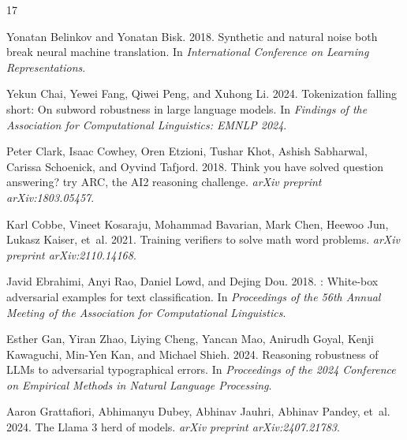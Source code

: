 \documentclass[11pt]{article} %
\providecommand{\DIFdelend}{} %
\DeclareRobustCommand{\DIFdelend}{\DIFOaddend \let\includegraphics\DIFOincludegraphics} %
\begin{document}
\DIFdelend \begin{thebibliography}{17}
\providecommand{\natexlab}[1]{#1}

Yonatan Belinkov and Yonatan Bisk. 2018.
\newblock Synthetic and natural noise both break neural machine translation.
\newblock In \emph{International Conference on Learning Representations}.

Yekun Chai, Yewei Fang, Qiwei Peng, and Xuhong Li. 2024.
\newblock Tokenization falling short: On subword robustness in large language
  models.
\newblock In \emph{Findings of the Association for Computational Linguistics:
  EMNLP 2024}.

Peter Clark, Isaac Cowhey, Oren Etzioni, Tushar Khot, Ashish Sabharwal, Carissa
  Schoenick, and Oyvind Tafjord. 2018.
\newblock Think you have solved question answering? try {ARC}, the {AI2}
  reasoning challenge.
\newblock \emph{arXiv preprint arXiv:1803.05457}.

Karl Cobbe, Vineet Kosaraju, Mohammad Bavarian, Mark Chen, Heewoo Jun, Lukasz
  Kaiser, et~al. 2021.
\newblock Training verifiers to solve math word problems.
\newblock \emph{arXiv preprint arXiv:2110.14168}.

Javid Ebrahimi, Anyi Rao, Daniel Lowd, and Dejing Dou. 2018.
: White-box adversarial examples for text classification.
\newblock In \emph{Proceedings of the 56th Annual Meeting of the Association
  for Computational Linguistics}.

Esther Gan, Yiran Zhao, Liying Cheng, Yancan Mao, Anirudh Goyal, Kenji
  Kawaguchi, Min-Yen Kan, and Michael Shieh. 2024.
\newblock Reasoning robustness of {LLM}s to adversarial typographical errors.
\newblock In \emph{Proceedings of the 2024 Conference on Empirical Methods in
  Natural Language Processing}.

Aaron Grattafiori, Abhimanyu Dubey, Abhinav Jauhri, Abhinav Pandey, et~al.
  2024.
\newblock The {Llama} 3 herd of models.
\newblock \emph{arXiv preprint arXiv:2407.21783}.


\end{thebibliography}
\end{document}
